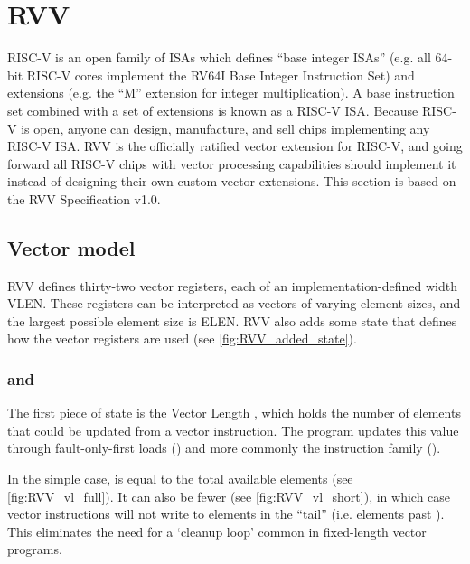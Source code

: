 \section{RVV}\label{chap:bg:sec:rvv}
RISC-V is an open family of ISAs which defines ``base integer ISAs'' (e.g. all 64-bit RISC-V cores implement the RV64I Base Integer Instruction Set) and extensions (e.g. the ``M'' extension for integer multiplication).
A base instruction set combined with a set of extensions is known as a RISC-V ISA.
Because RISC-V is open, anyone can design, manufacture, and sell chips implementing any RISC-V ISA.
RVV is the officially ratified vector extension for RISC-V, and going forward all RISC-V chips with vector processing capabilities should implement it instead of designing their own custom vector extensions.
This section is based on the RVV Specification v1.0.

\subsection{Vector model}
RVV defines thirty-two vector registers, each of an implementation-defined width VLEN.
These registers can be interpreted as vectors of varying element sizes, and the largest possible element size is ELEN.
RVV also adds some state that defines how the vector registers are used (see \cref{fig:RVV_added_state}).


\subsubsection{ and }
The first piece of state is the Vector Length , which holds the number of elements that could be updated from a vector instruction.
The program updates this value through fault-only-first loads () and more commonly the  instruction family ().

In the simple case,  is equal to the total available elements (see \cref{fig:RVV_vl_full}).
It can also be fewer (see \cref{fig:RVV_vl_short}), in which case vector instructions will not write to elements in the \enquote{tail} (i.e. elements past ).
This eliminates the need for a `cleanup loop' common in fixed-length vector programs.



